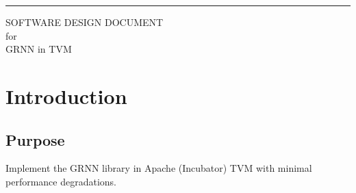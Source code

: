 \documentclass{scrreprt}
\date{}
\def\myversion{1.0 }
\begin{document}
\begin{flushright}
    \rule{16cm}{5pt}\vskip1cm
    \begin{bfseries}
        \Huge{SOFTWARE DESIGN DOCUMENT}\\
        \vspace{0.4cm}
        for\\
        \vspace{0.4cm}
        GRNN in TVM\\
    \end{bfseries}
\end{flushright}

\tableofcontents


%

\chapter{Introduction}

\section{Purpose}
Implement the GRNN library in Apache (Incubator) TVM with minimal performance degradations.
\end{document}

